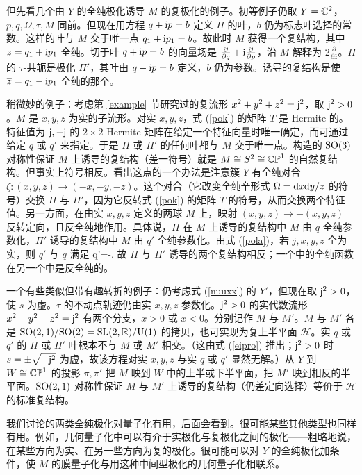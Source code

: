 但先看几个由 $Y$ 的全纯极化诱导 $M$ 的复极化的例子。初等例子仍取 $Y={\mathbb C}^2$，$p,q,\Omega,\tau,M$ 同前。但现在用方程 $q+{\mathrm i} p=b$ 定义 $\varPi$ 的叶，$b$ 仍为标志叶选择的常数。这样的叶与 $M$ 交于唯一点 $q_1+{\mathrm i} p_1=b$。故此时 $M$ 获得一个复结构，其中 $z=q_1+{\mathrm i} p_1$ 全纯。切于叶 $q+{\mathrm i} p=b$ 的向量场是 $\frac{\partial}{\partial q}+{\mathrm i}\frac{\partial}{\partial p}$，沿 $M$ 解释为 $2\frac{\partial}{\partial\bar z}$。$\varPi$ 的 $\tau$-共轭是极化 $\varPi'$，其叶由 $q-{\mathrm i} p=b$ 定义，$b$ 仍为参数。诱导的复结构是使 $\overline z=q_1-{\mathrm i} p_1$ 全纯的那个。

稍微妙的例子：考虑第 \ref{example} 节研究过的复流形 $x^2+y^2+z^2={\sf j}^2$，取 ${\sf j}^2>0$。$M$ 是 $x,y,z$ 为实的子流形。对实 $x,y,z$，式 (\ref{pok}) 的矩阵 $T$ 是 Hermite 的。特征值为 ${\sf j},-{\sf j}$ 的 $2\times2$ Hermite 矩阵在给定一个特征向量时唯一确定，而可通过给定 $q$ 或 $q'$ 来指定。于是 $\varPi$ 或 $\varPi'$ 的任何叶都与 $M$ 交于唯一点。构造的 ${\mathrm{SO}}(3)$ 对称性保证 $M$ 上诱导的复结构（差一符号）就是 $M\cong S^2\cong{\mathbb{CP}}^1$ 的自然复结构。但事实上符号相反。看出这点的一个办法是注意簇 $Y$ 有全纯对合 $\zeta:(x,y,z)\to(-x,-y,-z)$。这个对合（它改变全纯辛形式 $\Omega={\mathrm d} x{\mathrm d} y/z$ 的符号）交换 $\varPi$ 与 $\varPi'$，因为它反转式 (\ref{pok}) 的矩阵 $T$ 的符号，从而交换两个特征值。另一方面，在由实 $x,y,z$ 定义的两球 $M$ 上，映射 $(x,y,z)\to-(x,y,z)$ 反转定向，且反全纯地作用。具体说，$\varPi$ 在 $M$ 上诱导的复结构中 $M$ 由 $q$ 全纯参数化，$\varPi'$ 诱导的复结构中 $M$ 由 $q'$ 全纯参数化。由式 (\ref{pola})，若 $j,x,y,z$ 全为实，则 $q'$ 与 $q$ 满足
\be\label{inverso} q'=-. \ee
故 $\varPi$ 与 $\varPi'$ 诱导的两个复结构相反；一个中的全纯函数在另一个中是反全纯的。

一个有些类似但带有趣转折的例子：仍考虑式 (\ref{nuuxx}) 的 $Y'$，但现在取 ${\sf j}^2>0$，使 $s$ 为虚。$\tau$ 的不动点轨迹仍由实 $x,y,z$ 参数化。${\sf j}^2>0$ 的实代数流形 $x^2-y^2-z^2={\sf j}^2$ 有两个分支，$x>0$ 或 $x<0$。分别记作 $M$ 与 $M'$。$M$ 与 $M'$ 各是 ${\mathrm{SO}}(2,1)/{\mathrm{SO}}(2)={\mathrm{SL}}(2,{\mathbb R})/{\mathrm U}(1)$ 的拷贝，也可实现为复上半平面 $\mathcal H$。实 $q$ 或 $q'$ 的 $\varPi$ 或 $\varPi'$ 叶根本不与 $M$ 或 $M'$ 相交。（这由式 (\ref{eipro}) 推出；${\sf j}^2>0$ 时 $s=\pm\sqrt{-{\sf j}^2}$ 为虚，故该方程对实 $x,y,z$ 与实 $q$ 或 $q'$ 显然无解。）从 $Y$ 到 $W\cong{\mathbb{CP}}^1$ 的投影 $\pi,\pi'$ 把 $M$ 映到 $W$ 中的上半或下半平面，把 $M'$ 映到相反的半平面。${\mathrm{SO}}(2,1)$ 对称性保证 $M$ 与 $M'$ 上诱导的复结构（仍差定向选择）等价于 $\mathcal H$ 的标准复结构。

我们讨论的两类全纯极化对量子化有用，后面会看到。很可能某些其他类型也同样有用。例如，几何量子化中可以有介于实极化与复极化之间的极化——粗略地说，在某些方向为实、在另一些方向为复的极化。很可能可以对 $Y$ 的全纯极化加条件，使 $M$ 的膜量子化与用这种中间型极化的几何量子化相联系。
